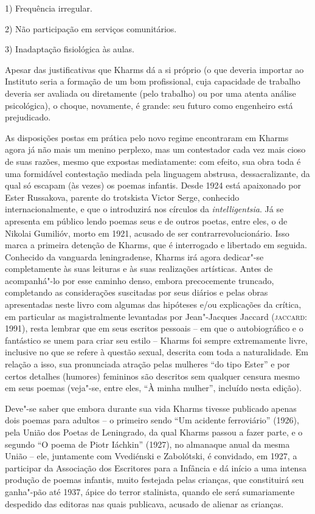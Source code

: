 1) Frequência irregular.

2) Não participação em serviços comunitários.

3) Inadaptação fisiológica às aulas.

Apesar das justificativas que Kharms dá a si próprio (o que deveria
importar ao Instituto seria a formação de um bom profissional, cuja
capacidade de trabalho deveria ser avaliada ou diretamente (pelo
trabalho) ou por uma atenta análise psicológica), o choque, novamente, é
grande: seu futuro como engenheiro está prejudicado.

As disposições postas em prática pelo novo regime encontraram em Kharms
agora já não mais um menino perplexo, mas um contestador cada vez mais
cioso de suas razões, mesmo que expostas mediatamente: com efeito, sua
obra toda é uma formidável contestação mediada pela linguagem abstrusa,
dessacralizante, da qual só escapam (às vezes) os poemas infantis. Desde
1924 está apaixonado por Ester Russakova, parente do trotskista Victor
Serge, conhecido internacionalmente, e que o introduzirá nos círculos da
\emph{intelligentsia}. Já se apresenta em público lendo poemas seus e de
outros poetas, entre eles, o de Nikolai Gumilióv, morto em 1921, acusado
de ser contrarrevolucionário. Isso marca a primeira detenção de Kharms,
que é interrogado e libertado em seguida. Conhecido da vanguarda
leningradense, Kharms irá agora dedicar"-se completamente às suas
leituras e às suas realizações artísticas. Antes de acompanhá"-lo por
esse caminho denso, embora precocemente truncado, completando as
considerações suscitadas por seus diários e pelas obras apresentadas
neste livro com algumas das hipóteses e/ou explicações da crítica, em
particular as magistralmente levantadas por Jean"-Jacques Jaccard
(\textsc{jaccard}: 1991), resta lembrar que em seus escritos pessoais --
em que o autobiográfico e o fantástico se unem para criar seu estilo --
Kharms foi sempre extremamente livre, inclusive no que se refere à
questão sexual, descrita com toda a naturalidade. Em relação a isso, sua
pronunciada atração pelas mulheres ``do tipo Ester'' e por certos
detalhes (humores) femininos são descritos sem qualquer censura mesmo em
seus poemas (veja"-se, entre eles, ``À minha mulher'', incluído nesta
edição).

Deve"-se saber que embora durante sua vida Kharms tivesse publicado
apenas dois poemas para adultos -- o primeiro sendo ``Um acidente
ferroviário'' (1926), pela União dos Poetas de Leningrado, da qual
Kharms passou a fazer parte, e o segundo ``O poema de Piotr Iáchkin''
(1927), no almanaque anual da mesma União -- ele, juntamente com
Vvediénski e Zabolótski, é convidado, em 1927, a participar da
Associação dos Escritores para a Infância e dá início a uma intensa
produção de poemas infantis, muito festejada pelas crianças, que
constituirá seu ganha"-pão até 1937, ápice do terror stalinista, quando
ele será sumariamente despedido das editoras nas quais publicava,
acusado de alienar as crianças.

